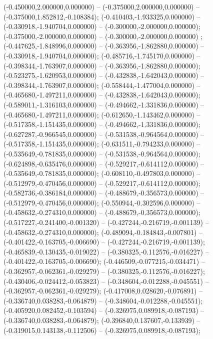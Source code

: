  (-0.450000,2.000000,0.000000) -- (-0.375000,2.000000,0.000000) -- (-0.375000,1.852812,-0.108384);
 (-0.410403,-1.933325,0.000000) -- (-0.330918,-1.940704,0.000000) -- (-0.300000,-2.000000,0.000000);
 (-0.375000,-2.000000,0.000000) -- (-0.300000,-2.000000,0.000000) ;
 (-0.447625,-1.848996,0.000000) -- (-0.363956,-1.862880,0.000000) -- (-0.330918,-1.940704,0.000000);
 (-0.485716,-1.745170,0.000000) -- (-0.398344,-1.763907,0.000000) -- (-0.363956,-1.862880,0.000000);
 (-0.523275,-1.620953,0.000000) -- (-0.432838,-1.642043,0.000000) -- (-0.398344,-1.763907,0.000000);
 (-0.558444,-1.477004,0.000000) -- (-0.465680,-1.497211,0.000000) -- (-0.432838,-1.642043,0.000000);
 (-0.589011,-1.316103,0.000000) -- (-0.494662,-1.331836,0.000000) -- (-0.465680,-1.497211,0.000000);
 (-0.612650,-1.143462,0.000000) -- (-0.517358,-1.151435,0.000000) -- (-0.494662,-1.331836,0.000000);
 (-0.627287,-0.966545,0.000000) -- (-0.531538,-0.964564,0.000000) -- (-0.517358,-1.151435,0.000000);
 (-0.631511,-0.794233,0.000000) -- (-0.535649,-0.781835,0.000000) -- (-0.531538,-0.964564,0.000000);
 (-0.624898,-0.635476,0.000000) -- (-0.529217,-0.614112,0.000000) -- (-0.535649,-0.781835,0.000000);
 (-0.608110,-0.497803,0.000000) -- (-0.512979,-0.470456,0.000000) -- (-0.529217,-0.614112,0.000000);
 (-0.582736,-0.386184,0.000000) -- (-0.488679,-0.356573,0.000000) -- (-0.512979,-0.470456,0.000000);
 (-0.550944,-0.302596,0.000000) -- (-0.458632,-0.274310,0.000000) -- (-0.488679,-0.356573,0.000000);
 (-0.517227,-0.241400,-0.001320) -- (-0.427244,-0.216719,-0.001139) -- (-0.458632,-0.274310,0.000000);
 (-0.489094,-0.184843,-0.007801) -- (-0.401422,-0.163705,-0.006690) -- (-0.427244,-0.216719,-0.001139);
 (-0.465839,-0.130435,-0.019022) -- (-0.380325,-0.112576,-0.016227) -- (-0.401422,-0.163705,-0.006690);
 (-0.446509,-0.077215,-0.034471) -- (-0.362957,-0.062361,-0.029279) -- (-0.380325,-0.112576,-0.016227);
 (-0.430406,-0.024412,-0.053823) -- (-0.348604,-0.012288,-0.045551) -- (-0.362957,-0.062361,-0.029279);
 (-0.417008,0.028620,-0.076891) -- (-0.336740,0.038283,-0.064879) -- (-0.348604,-0.012288,-0.045551);
 (-0.405920,0.082452,-0.103594) -- (-0.326975,0.089918,-0.087193) -- (-0.336740,0.038283,-0.064879);
 (-0.396840,0.137607,-0.133939) -- (-0.319015,0.143138,-0.112506) -- (-0.326975,0.089918,-0.087193);
